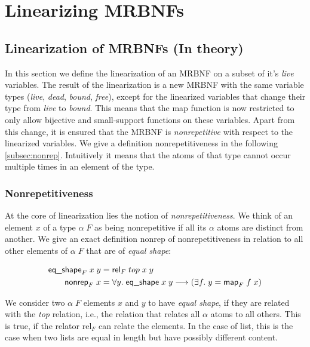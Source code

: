 
\chapter{Linearizing MRBNFs}
\label{chapter:methodology}

\section{Linearization of MRBNFs (In theory)}

  In this section we define the linearization of an MRBNF on a subset of it's \textit{live} variables. The result of the linearization is a new MRBNF with the same variable types (\textit{live}, \textit{dead}, \textit{bound}, \textit{free}), except for the linearized variables that change their type from \textit{live} to \textit{bound}. This means that the map function is now restricted to only allow bijective and small-support functions on these variables. Apart from this change, it is ensured that the MRBNF is \textit{nonrepetitive} with respect to the linearized variables. We give a definition nonrepetitiveness in the following \autoref{subsec:nonrep}. Intuitively it means that the atoms of that type cannot occur multiple times in an element of the type.

  \subsection{Nonrepetitiveness}
  \label{subsec:nonrep}
    At the core of linearization lies the notion of \textit{nonrepetitiveness}. We think of an element $x$ of a type $\alpha\; F$ as being nonrepetitive if all its $\alpha$ atoms are distinct from another. We give an exact definition \textsf{nonrep} of nonrepetitiveness in relation to all other elements of $\alpha\; F$ that are of \textit{equal shape}:

    \begin{align}
      \text{\textsf{eq\_shape}}_F\; x\; y &= \text{\textsf{rel}}_F\; top\; x\; y\\
      \text{\textsf{nonrep}}_F\; x &= \forall y.\; \text{\textsf{eq\_shape}}\; x\; y \longrightarrow (\exists f.\; y = \text{\textsf{map}}_F\; f\; x)
    \end{align}

    We consider two $\alpha\; F$ elements $x$ and $y$ to have \textit{equal shape}, if they are related with the \textit{top} relation, i.e., the relation that relates all $\alpha$ atoms to all others. This is true, if the relator \textsf{rel}$_F$ can relate the elements. In the case of \textsf{list}, this is the case when two lists are equal in length but have possibly different content. 

